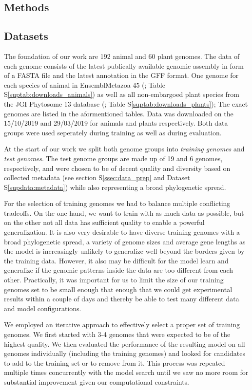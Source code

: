 \documentclass{bioinfo}
\newcounter{suptab}
\newcounter{supdata}
\begin{document}
\begin{methods}
\section{Methods}
\subsection{Datasets}
The foundation of our work are 192 animal and 60 plant genomes. The data of each 
genome consists of the latest publically available genomic assembly in form of a 
FASTA file and the latest annotation in the GFF format. One genome for each species of animal 
in EnsemblMetazoa 45 (\cite{howe2020ensembl}; Table S\ref{suptab:downloads_animals}) 
as well as all non-embargoed plant species from the JGI Phytosome 13 database 
(\cite{goodstein2012phytozome}; Table S\ref{suptab:downloads_plants}); The exact 
genomes are listed in the aformentioned tables.
Data was downloaded on the 15/10/2019 and 29/03/2019 for animals and plants respectively. 
Both data groups were used seperately during training as well as during evaluation. 

At the start of our work we split both genome groups into {\it training genomes} and 
{\it test genomes}. The test genome groups are made up of 19 and 6 genomes, 
respectively, and were chosen to be of decent quality and diversity based on collected 
metadata (see section S\ref{ssec:data_prep} and Dataset S\ref{supdata:metadata}) 
while also representing a broad phylogenetic spread. 

For the selection of training genomes we had to balance multiple conflicting 
tradeoffs. On the one hand, we want to train with as much data as possible, but 
on the other
not all data has sufficient quality to enable a powerful generalization. It is 
also very desirable to have diverse training genomes with a broad phylogenetic spread, 
a variety of genome sizes and average gene lengths as the model is increasingly unlikely to generalize 
well beyond the borders given by the training data. However, it also may be difficult 
for the model learn and generalize if the genomic patterns inside the data are 
too different from each other. Practically, it was important for us to limit the size of
our training genomes set to be small enough that enough that we could get experimental 
results within a couple of days and thereby be able to test many different data and 
model configurations.

We employed an iterative approach to effectively select a proper set of training 
genomes. We first started with 3-4 genomes that were expected to be of the 
highest quality. We then evaluated the performance of the resulting model on all 
genomes individually (including the training genomes) and looked for candidates to 
add to the training set or to remove from it. This process was repeated multiple 
times concurrently with the model search until we saw no more room for substantial 
improvement given our computational constraints.


\end{methods}
\end{document}
